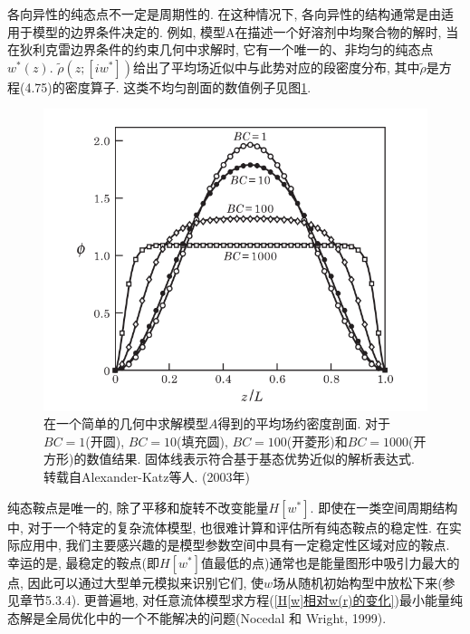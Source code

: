 各向异性的纯态点不一定是周期性的. 在这种情况下, 各向异性的结构通常是由适用于模型的边界条件决定的. 例如, 模型A在描述一个好溶剂中均聚合物的解时, 当在狄利克雷边界条件的约束几何中求解时, 它有一个唯一的、非均匀的纯态点$w^*(z)$. $\tilde{\rho}(z;[iw^*])$给出了平均场近似中与此势对应的段密度分布, 其中$\tilde{\rho}$是方程(4.75)的密度算子. 这类不均匀剖面的数值例子见图\ref{剖面}. 
\begin{figure}[H]
       \centering
        \includegraphics[width=12cm]{Contents/chapter5/figures/2.png}
       \caption{在一个简单的几何中求解模型$A$得到的平均场约密度剖面. 对于$BC=1$(开圆), $BC=10$(填充圆), $BC=100$(开菱形)和$BC=1000$(开方形)的数值结果. 固体线表示符合基于基态优势近似的解析表达式. 转载自Alexander-Katz等人. (2003年)}
        \label{剖面}
 \end{figure}

纯态鞍点是唯一的, 除了平移和旋转不改变能量$H[w^*]$. 即使在一类空间周期结构中, 对于一个特定的复杂流体模型, 也很难计算和评估所有纯态鞍点的稳定性. 在实际应用中, 我们主要感兴趣的是模型参数空间中具有一定稳定性区域对应的鞍点. 幸运的是, 最稳定的鞍点(即$H[w^*]$值最低的点)通常也是能量图形中吸引力最大的点, 因此可以通过大型单元模拟来识别它们, 使$w$场从随机初始构型中放松下来(参见章节5.3.4). 更普遍地, 对任意流体模型求方程(\ref{H[w]相对w(r)的变化})最小能量纯态解是全局优化中的一个不能解决的问题(Nocedal 和 Wright, 1999). \\

